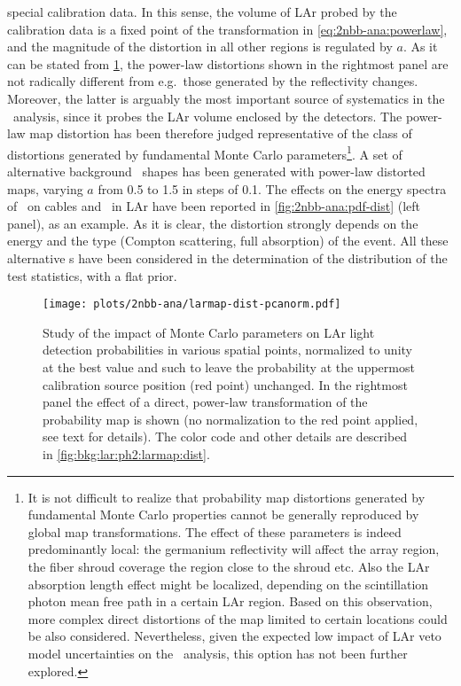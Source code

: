 \begin{description}[wide]
    special calibration data. In this sense, the volume of LAr probed by the calibration
    data is a fixed point of the transformation in \cref{eq:2nbb-ana:powerlaw}, and the
    magnitude of the distortion in all other regions is regulated by $a$.
    \newpar
    As it can be stated from \cref{fig:2nbb-ana:dist-pcanorm}, the power-law distortions
    shown in the rightmost panel are not radically different from e.g.~those generated by
    the reflectivity changes. Moreover, the latter is arguably the most important source
    of systematics in the \nnbb\ analysis, since it probes the LAr volume enclosed by the
    detectors. The power-law map distortion has been therefore judged representative
    of the class of distortions generated by fundamental Monte Carlo parameters\footnote{%
      It is not difficult to realize that probability map distortions generated by
      fundamental Monte Carlo properties cannot be generally reproduced by global map
      transformations. The effect of these parameters is indeed predominantly local: the
      germanium reflectivity will affect the array region, the fiber shroud coverage the
      region close to the shroud etc. Also the LAr absorption length effect might be
      localized, depending on the scintillation photon mean free path in a certain LAr
      region.  Based on this observation, more complex direct distortions of the map
      limited to certain locations could be also considered. Nevertheless, given the
      expected low impact of LAr veto model uncertainties on the \nnbb\ analysis, this
      option has not been further explored.
    }.
    \newpar
    A set of alternative background \pdf\ shapes has been generated with power-law distorted
    maps, varying $a$ from 0.5 to 1.5 in steps of 0.1. The effects on the energy
    spectra of \kvn\ on cables and \kvz\ in LAr have been reported in
    \cref{fig:2nbb-ana:pdf-dist} (left panel), as an example. As it is clear, the
    distortion strongly depends on the energy and the type (Compton scattering, full
    absorption) of the event. All these alternative \pdf{}s have been considered in the
    determination of the distribution of the test statistics, with a flat prior.

    \begin{figure}
      \centering
      \texttt{[image: plots/2nbb-ana/larmap-dist-pcanorm.pdf]}
      \caption{%
        Study of the impact of Monte Carlo parameters on LAr light detection probabilities in
        various spatial points, normalized to unity at the best value and such to leave the
        probability at the uppermost calibration source position (red point) unchanged. In
        the rightmost panel the effect of a direct, power-law transformation of the
        probability map is shown (no normalization to the red point applied, see text for
        details). The color code and other details are described in
        \cref{fig:bkg:lar:ph2:larmap:dist}.
      }\label{fig:2nbb-ana:dist-pcanorm}
    \end{figure}


\end{description}
